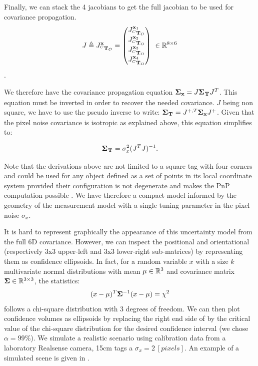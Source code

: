 Finally, we can stack the 4 jacobians to get the full jacobian to be used for covariance propagation.
\begin{equation}
    J \triangleq J^{{\bf x}}_{\prescript{C}{}{{\bf T}}_{O}}=
    \begin{pmatrix}
    J^{{\bf x}_1}_{\prescript{C}{}{{\bf T}}_{O}} \\ J^{{\bf x}_2}_{\prescript{C}{}{{\bf T}}_{O}} \\ J^{{\bf x}_3}_{\prescript{C}{}{{\bf T}}_{O}} \\ J^{{\bf x}_4}_{\prescript{C}{}{{\bf T}}_{O}}
    \end{pmatrix}
    ~ \in \mathbb{R}^{8 \times 6}
\end{equation}.

We therefore have the covariance propagation equation ${\bm \Sigma}_{{\bf x}} = J {\bm \Sigma}_{\prescript{}{}{{\bf T}}_{}} J^T$. 
This equation must be inverted in order to recover the needed covariance. $J$ being non square, 
we have to use the pseudo inverse to write: ${\bm \Sigma}_{\prescript{}{}{{\bf T}}_{}} = J^{+,T} {\bm \Sigma}_{{\bf x}} J^{+}$. 
Given that the pixel noise covariance is isotropic as explained above, this equation simplifies to:

\begin{equation}
    {\bm \Sigma}_{\prescript{}{}{{\bf T}}_{}} = \sigma_{x}^2(J^T J)^{-1}.
\end{equation}

Note that the derivations above are not limited to a square tag with four corners and could be used for any object defined as
a set of points in its local coordinate system provided their configuration is not degenerate and makes the PnP computation possible \cite{gao2003complete}.  
We have therefore a compact model informed by the geometry of the measurement model with a single tuning parameter in the pixel noise $\sigma_x$.

It is hard to represent graphically the appearance of this uncertainty model from the full 6D covariance. However, we can inspect the positional and orientational
(respectively 3x3 upper-left and 3x3 lower-right sub-matrices) by representing them as confidence ellipsoids.
In fact, for a random variable $x$ with a size $k$ multivariate normal distributions with mean $\mu \in \mathbb{R}^3$ and 
covariance matrix ${\bm \Sigma} \in \mathbb{R}^{3 \times 3}$, the statistics:
%
\begin{equation}
    (x - \mu)^T {\bm \Sigma}^{-1}(x - \mu) = \chi^2
    \label{eq:chi2}
\end{equation}
%
follows a chi-square distribution with 3 degrees of freedom. We can then plot confidence volumes as ellipsoids by replacing the right end side of  
 by the critical value of the chi-square distribution for the desired confidence interval (we chose $\alpha=99\%$). We simulate a 
realistic scenario using calibration data from a laboratory Realsense camera, 15cm tags a $\sigma_x = 2~[pixels]$. An example of a simulated scene is given
in . 

